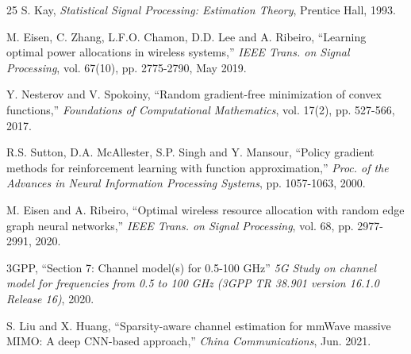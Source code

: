\documentclass[a4paper, 12pt, onecolumn, journal, twoside, draftclsnofoot]{IEEEtran}
\begin{document}
\begin{thebibliography}{25}
S. Kay, \emph{Statistical Signal Processing: Estimation Theory}, Prentice Hall, 1993.

M. Eisen, C. Zhang, L.F.O. Chamon, D.D. Lee and A. Ribeiro, ``Learning optimal power allocations in wireless systems,'' \emph{IEEE Trans. on Signal Processing}, vol. 67(10), pp. 2775-2790, May 2019.

Y. Nesterov and V. Spokoiny, ``Random gradient-free minimization of convex functions,'' \emph{Foundations of Computational Mathematics}, vol. 17(2), pp. 527-566, 2017.

R.S. Sutton, D.A. McAllester, S.P. Singh and Y. Mansour, ``Policy gradient methods for reinforcement learning with function approximation,'' \emph{Proc. of the Advances in Neural Information Processing Systems}, pp. 1057-1063, 2000.

M. Eisen and A. Ribeiro, ``Optimal wireless resource allocation with random edge graph neural networks,'' \emph{IEEE Trans. on Signal Processing}, vol. 68, pp. 2977-2991, 2020.

3GPP, ``Section 7: Channel model(s) for 0.5-100 GHz'' \emph{5G Study on channel model for frequencies from 0.5 to 100 GHz (3GPP TR 38.901 version 16.1.0 Release 16)}, 2020.

S. Liu and X. Huang, ``Sparsity-aware channel estimation for mmWave massive MIMO: A deep CNN-based approach,'' \emph{China Communications}, Jun. 2021.

\end{thebibliography}
\end{document}
